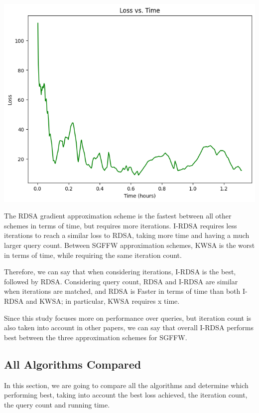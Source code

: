 \documentclass[10pt,twocolumn,letterpaper]{article}
\begin{document}
\begin{center}
   \includegraphics*[scale=0.40]{img/I-RDSA_loss_time.png}
\end{center}

The RDSA gradient approximation scheme is the fastest between all other
schemes in terms of time, but requires more iterations.
I-RDSA requires less iterations to reach a similar loss to RDSA,
taking more time and having a much larger query count.
Between SGFFW approximation schemes, KWSA is the worst in terms of time,
while requiring the same iteration count.

Therefore, we can say that when considering iterations, I-RDSA is the best, followed by RDSA.
Considering query count, RDSA and I-RDSA are similar when iterations are matched, and RDSA is Faster
in terms of time than both I-RDSA and KWSA; in particular, KWSA requires x time.

Since this study focuses more on performance over queries, but iteration count is also taken into account
in other papers, we can say that overall I-RDSA performs best between the three approximation schemes for SGFFW. 

\subsection{All Algorithms Compared}

In this section, we are going to compare all the algorithms and determine which performing best,
taking into account the best loss achieved, the iteration count, the query count and running time.
\end{document}
